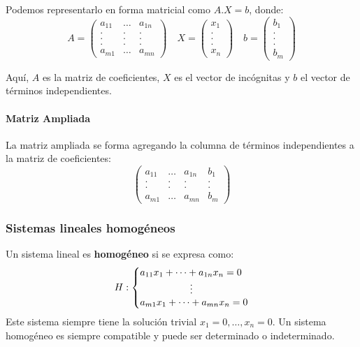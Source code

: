 \documentclass{article}
\begin{document}
    Podemos representarlo en forma matricial como $A.X = b$, donde:
    \[
    A = 
    \begin{pmatrix}
    a_{11}  & \dots & a_{1n}\\
    .       & .     & .\\
    .       & .     & .\\
    .       & .     & .\\
    a_{m1}  & \dots & a_{mn}
    \end{pmatrix}
    \quad
    X = 
    \begin{pmatrix}
    x_1\\
    .\\
    .\\
    .\\
    x_n
    \end{pmatrix}
    \quad
    b = 
    \begin{pmatrix}
    b_1\\
    .\\
    .\\
    .\\
    b_m
    \end{pmatrix}
    \]
    
    Aquí, $A$ es la matriz de coeficientes, $X$ es el vector de incógnitas y $b$ el vector de términos independientes.
    
    \paragraph{Matriz Ampliada}
    
    La matriz ampliada se forma agregando la columna de términos independientes a la matriz de coeficientes:
    \[
    \begin{pmatrix}
    a_{11} & \dots & a_{1n} & b_1 \\
    .      & .     & .      & .   \\
    .      & .     & .      & .   \\
    a_{m1} & \dots & a_{mn} & b_m
    \end{pmatrix}
    \]
    
    \subsubsection*{Sistemas lineales homogéneos}
    
    Un sistema lineal es \textbf{homogéneo} si se expresa como:
    \[
    H: \left \{
    \begin{array}{@{}l@{}}
    a_{11}x_1 + \dots + a_{1n}x_n = 0 \\
    \hspace{1.8cm}\vdots\\
    a_{m1}x_1 + \dots + a_{mn}x_n = 0
    \end{array}
    \right.
    \]
    Este sistema siempre tiene la solución trivial $x_1 = 0,\dots, x_n = 0$. Un sistema homogéneo es siempre compatible y puede ser determinado o indeterminado.
    
\end{document}
